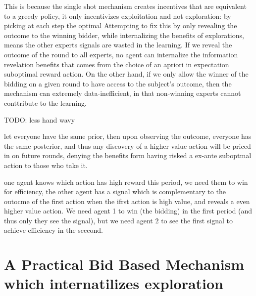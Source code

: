 This is because the single shot mechanism creates incentives that are equivalent to a greedy policy, it only incentivizes exploitation and not exploration: by picking at each step the optimal 
Attempting to fix this by only revealing the outcome to the winning bidder, while internalizing the benefits of explorations, means the other experts signals are wasted in the learning. 
If we reveal the outcome of the round to all experts,  no agent can internalize the information revelation benefits that comes from the choice of an apriori in expectation suboptimal reward action. On the other hand, if we only allow the winner of the bidding on a given round to have access to the subject's outcome, then the mechanism can extremely data-inefficient, in that non-winning experts cannot conttribute to the learning.


TODO: less hand wavy
\begin{eg}
let everyone have the same prior, then upon observing the outcome, everyone has the same posterior, and thus any discovery of a higher value action will be priced in on future rounds, denying the benefits form having risked a ex-ante suboptmal action to those who take it. 
\end{eg}

\begin{eg}
one agent knows which action has high reward this period, we need them to win for efficiency, the other agent has a signal which is complementary to the outocme of the first action when the ifrst action is high value, and reveals a even higher value action. We need agent 1 to win (the bidding) in the first period (and thus only they see the signal), but we need agent 2 to see the first signal to achieve efficiency in the seccond.
\end{eg}




\section{A Practical Bid Based Mechanism which internatilizes exploration}

